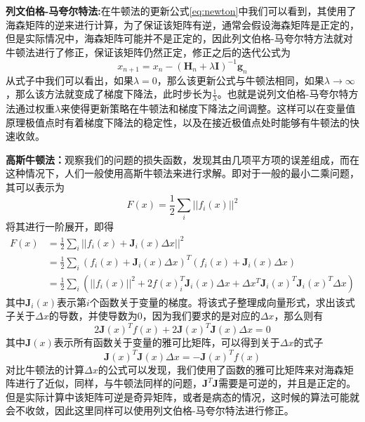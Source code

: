 \textbf{列文伯格-马夸尔特法:}在牛顿法的更新公式\ref{eq:newton}中我们可以看到，其使用了海森矩阵的逆来进行计算，为了保证该矩阵有逆，通常会假设海森矩阵是正定的，但是实际情况中，海森矩阵可能并不是正定的，因此列文伯格-马夸尔特方法就对牛顿法进行了修正，保证该矩阵仍然正定，修正之后的迭代公式为
\begin{equation}
    x_{n+1} = x_n - (\mathbf{H}_n + \lambda \mathbf{I})^{-1} \mathbf { g } _ { n }
\end{equation}
从式子中我们可以看出，如果\(\lambda = 0\)，那么该更新公式与牛顿法相同，如果\(\lambda \rightarrow \infty\)，那么该方法就变成了梯度下降法，此时步长为\(\frac{1}{\lambda}\)。也就是说列文伯格-马夸尔特方法通过权重\(\lambda\)来使得更新策略在牛顿法和梯度下降法之间调整。这样可以在变量值原理极值点时有着梯度下降法的稳定性，以及在接近极值点处时能够有牛顿法的快速收敛。


\textbf{高斯牛顿法：}观察我们的问题的损失函数，发现其由几项平方项的误差组成，而在这种情况下，人们一般使用高斯牛顿法来进行求解。即对于一般的最小二乘问题，其可以表示为
\begin{equation}
    F(x) = \frac{1}{2}\sum_i ||f_i(x)||^2
\end{equation}
将其进行一阶展开，即得
\begin{align}
    F(x) &= \frac{1}{2}\sum_i ||f_i(x) + \bm{J}_i(x)\Delta x||^2 \\
         &= \frac{1}{2}\sum_i (f_i(x) + \bm{J}_i(x)\Delta x)^T   (f_i(x) + \bm{J}_i(x)\Delta x) \\
         &= \frac{1}{2}\sum_i\left(||f_i(x)||^2 +2f(x)_i^T\bm{J}_i(x)\Delta x + \Delta x^T\bm{J}_i(x)^T\bm{J}_i(x)^T\Delta x\right)
\end{align}
其中\(\bm{J}_i(x)\)表示第\(i\)个函数关于变量的梯度。将该式子整理成向量形式，求出该式子关于\(\Delta x\)的导数，并使导数为0，因为我们要求的是对应的\(\Delta x\)，那么则有
\begin{equation}
    2\bm{J}(x)^Tf(x) + 2\bm{J}(x)^T\bm{J}(x)\Delta x = 0
\end{equation}
其中\(\bm{J}(x)\)表示所有函数关于变量的雅可比矩阵，可以得到关于\(\Delta x\)的式子
\begin{equation}
    \bm{J}(x)^T\bm{J}(x)\Delta x = -\bm{J}(x)^Tf(x)
\end{equation}
对比牛顿法的计算\(\Delta x\)的公式可以发现，我们使用了函数的雅可比矩阵来对海森矩阵进行了近似，同样，与牛顿法同样的问题，\(\bm{J}^T\bm{J}\)需要是可逆的，并且是正定的。但是实际计算中该矩阵可逆是奇异矩阵，或者是病态的情况，这时候的算法可能就会不收敛，因此这里同样可以使用列文伯格-马夸尔特法进行修正。

